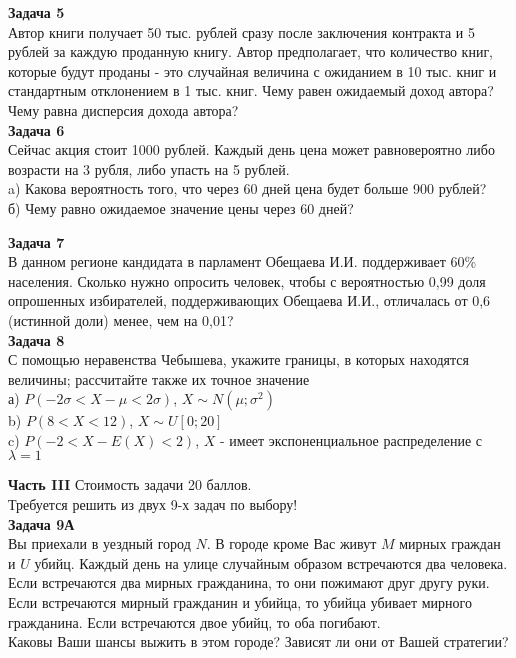 \documentclass[pdftex,12pt,a4paper]{article}
\begin{document}
\textbf{Задача 5} \\ %
Автор книги получает 50 тыс. рублей сразу после заключения
контракта и 5 рублей за каждую проданную книгу. Автор
предполагает, что количество книг, которые будут проданы - это
случайная величина с ожиданием в 10 тыс. книг и стандартным
отклонением в 1 тыс. книг. Чему равен ожидаемый доход автора? Чему
равна дисперсия дохода автора?\\



\textbf{Задача 6} \\ %
Сейчас акция стоит 1000 рублей. Каждый день цена может равновероятно либо возрасти на 3 рубля, либо упасть на 5 рублей. \\
a) Какова вероятность того, что через 60 дней цена будет больше 900 рублей? \\
б) Чему равно ожидаемое значение цены через 60 дней? \\

\newpage

\textbf{Задача 7} \\ %
 В данном регионе кандидата в парламент Обещаева И.И.
поддерживает 60\% населения. Сколько нужно опросить человек, чтобы
с вероятностью 0,99 доля  опрошенных избирателей, поддерживающих
Обещаева И.И.,  отличалась от 0,6 (истинной доли) менее, чем на
0,01? \\


\textbf{Задача 8} \\ %
С помощью неравенства Чебышева, укажите границы, в которых
находятся величины; рассчитайте также их точное значение \\
а) $P(-2\sigma<X-\mu<2\sigma)$, $X\sim N(\mu;\sigma^{2})$ \\
b) $P(8<X<12)$, $X\sim U[0;20]$ \\
c) $P(-2<X-E(X)<2)$, $X$ - имеет экспоненциальное распределение с
$\lambda=1$



\textbf{Часть III} Стоимость задачи 20 баллов. \\

Требуется решить \textbf{} из двух 9-х задач по
выбору! \\


\textbf{Задача 9А} \\
Вы приехали в уездный город $N$. В городе кроме Вас живут $M$ мирных граждан и $U$ убийц. Каждый день на улице случайным образом встречаются два человека. Если встречаются два мирных гражданина, то они пожимают друг другу руки. Если встречаются мирный гражданин и убийца, то убийца убивает мирного гражданина. Если встречаются двое убийц, то оба погибают. \\
Каковы Ваши шансы выжить в этом городе? Зависят ли они от Вашей стратегии?  \\
\end{document}

